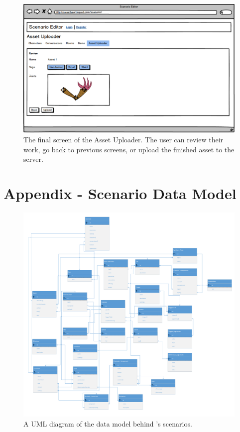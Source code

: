 \begin{figure}[H]
\centering\includegraphics[width=0.95\linewidth, height=0.7\paperheight, keepaspectratio=true]{images/AssetUploader_Arm5}
  \caption{The final screen of the Asset Uploader. The user can review their work, go back to previous screens, or upload the finished asset to the server.}
  \label{fig:mockup_asset_5}
\end{figure}

\chapter{Appendix - Scenario Data Model}
\label{app:DataModel}
\begin{figure}[H]
\centering\includegraphics[width=0.95\linewidth, height=0.75\paperheight, keepaspectratio=true]{DataModel}
  \caption{A UML diagram of the data model behind \ourgame{}'s scenarios.}
  \label{fig:UML}
\end{figure}


